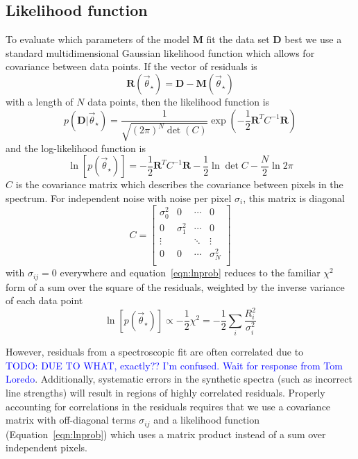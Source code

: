 \documentclass[iop,floatfix]{emulateapj}
\newcommand{\vt}{\vec{\theta}}
\newcommand{\vstar}{\vt_{\star}}
\newcommand{\fM}{ {\bm M}}
\newcommand{\fD}{ {\bm D}}
\newcommand{\fR}{ {\bm R}}
\newcommand{\todo}[1]{ \textcolor{Blue}{\\TODO: #1}}
\begin{document}
\subsection{Likelihood function}
To evaluate which parameters of the model $\fM$ fit the data set $\fD$ best we
 use a standard multidimensional Gaussian likelihood function which allows for
 covariance between data points. 
If the vector of residuals is 
\begin{equation}
  \fR(\vstar) = \fD - \fM(\vstar)
\end{equation}
 with a length of $N$ data points, then the likelihood function is
\begin{equation}
  p(\fD | \vstar) = \frac{1}{\sqrt{(2 \pi)^N \det(C)}} \exp\left ( -\frac{1}{2} \fR^T C^{-1} \fR \right ) 
\end{equation}
 and the log-likelihood function is
\begin{equation}
    \ln[p(\vstar)] = -\frac{1}{2} \fR^T C^{-1} \fR - \frac{1}{2} \ln \det C  - \frac{N}{2} \ln 2 \pi 
    \label{eqn:lnprob}
\end{equation}
$C$ is the covariance matrix which describes the covariance between pixels in
 the spectrum. 
For independent noise with noise per pixel $\sigma_i$, this matrix is diagonal
\begin{equation}
  C = 
  \begin{bmatrix}
    \sigma_0^2 & 0  & \cdots & 0\\
    0 & \sigma_1^2 & \cdots & 0\\
    \vdots  &   & \ddots  & \vdots \\
    0 & 0 & \cdots & \sigma_N^2\\
  \end{bmatrix}
  \label{eqn:covariance_diagonal}
\end{equation}
with $\sigma_{ij} = 0$ everywhere and equation~\ref{eqn:lnprob} reduces to the
 familiar $\chi^2$ form of a sum over the square of the residuals, weighted by
 the inverse variance of each data point
\begin{equation}
  \ln[p(\vstar)] \propto - \frac{1}{2} \chi^2 = - \frac{1}{2} \sum_i \frac{R_i^2}{\sigma_i^2}
\end{equation}

However, residuals from a spectroscopic fit are often correlated due to
 \todo{DUE TO WHAT, exactly?? I'm confused. 
Wait for response from Tom Loredo}. 
Additionally, systematic errors in the synthetic spectra (such as incorrect
 line strengths) will result in regions of highly correlated residuals. 
Properly accounting for correlations in the residuals requires that we use a
 covariance matrix with off-diagonal terms $\sigma_{ij}$ and a likelihood
 function (Equation~\ref{eqn:lnprob}) which uses a matrix product instead of a
 sum over independent pixels.
\end{document}
